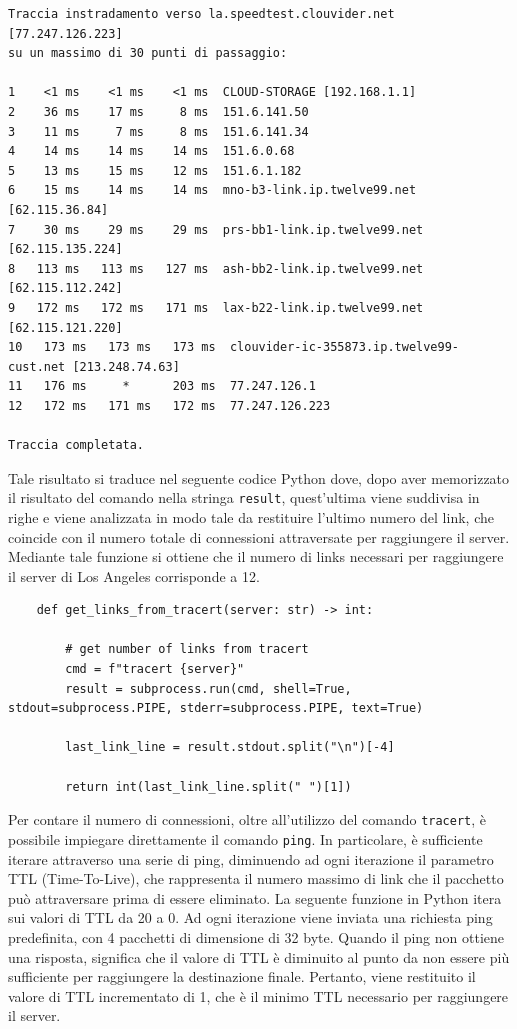 \begin{lstlisting}[style = bash]
Traccia instradamento verso la.speedtest.clouvider.net [77.247.126.223]
su un massimo di 30 punti di passaggio:

1    <1 ms    <1 ms    <1 ms  CLOUD-STORAGE [192.168.1.1] 
2    36 ms    17 ms     8 ms  151.6.141.50 
3    11 ms     7 ms     8 ms  151.6.141.34 
4    14 ms    14 ms    14 ms  151.6.0.68 
5    13 ms    15 ms    12 ms  151.6.1.182 
6    15 ms    14 ms    14 ms  mno-b3-link.ip.twelve99.net [62.115.36.84] 
7    30 ms    29 ms    29 ms  prs-bb1-link.ip.twelve99.net [62.115.135.224] 
8   113 ms   113 ms   127 ms  ash-bb2-link.ip.twelve99.net [62.115.112.242] 
9   172 ms   172 ms   171 ms  lax-b22-link.ip.twelve99.net [62.115.121.220] 
10   173 ms   173 ms   173 ms  clouvider-ic-355873.ip.twelve99-cust.net [213.248.74.63] 
11   176 ms     *      203 ms  77.247.126.1 
12   172 ms   171 ms   172 ms  77.247.126.223 

Traccia completata.
\end{lstlisting}

\noindent Tale risultato si traduce nel seguente codice Python dove, dopo aver memorizzato il risultato del comando nella stringa \texttt{result}, quest'ultima viene suddivisa in righe e viene analizzata in modo tale da restituire l'ultimo numero del link, che coincide con il numero totale di connessioni attraversate per raggiungere il server. Mediante tale funzione si ottiene che il numero di links necessari per raggiungere il server di Los Angeles corrisponde a 12.

\begin{lstlisting}
    def get_links_from_tracert(server: str) -> int:

        # get number of links from tracert
        cmd = f"tracert {server}"
        result = subprocess.run(cmd, shell=True, stdout=subprocess.PIPE, stderr=subprocess.PIPE, text=True)

        last_link_line = result.stdout.split("\n")[-4]

        return int(last_link_line.split(" ")[1])
\end{lstlisting}

\noindent Per contare il numero di connessioni, oltre all'utilizzo del comando \texttt{tracert}, è possibile impiegare direttamente il comando \texttt{ping}. In particolare, è sufficiente iterare attraverso una serie di ping, diminuendo ad ogni iterazione il parametro TTL (Time-To-Live), che rappresenta il numero massimo di link che il pacchetto può attraversare prima di essere eliminato. La seguente funzione in Python itera sui valori di TTL da 20 a 0. Ad ogni iterazione viene inviata una richiesta ping predefinita, con 4 pacchetti di dimensione di 32 byte. Quando il ping non ottiene una risposta, significa che il valore di TTL è diminuito al punto da non essere più sufficiente per raggiungere la destinazione finale. Pertanto, viene restituito il valore di TTL incrementato di 1, che è il minimo TTL necessario per raggiungere il server.

